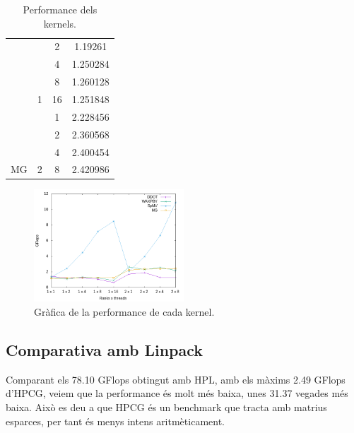 \begin{table}[]
\begin{tabular}{cccc}
                         & \cellcolor[HTML]{EFEFEF}                    & \cellcolor[HTML]{EFEFEF}2  & \cellcolor[HTML]{EFEFEF}1.19261   \\
                         & \cellcolor[HTML]{EFEFEF}                    & 4                          & 1.250284                          \\
                         & \cellcolor[HTML]{EFEFEF}                    & \cellcolor[HTML]{EFEFEF}8  & \cellcolor[HTML]{EFEFEF}1.260128  \\
                         & \multirow{-5}{*}{\cellcolor[HTML]{EFEFEF}1} & 16                         & 1.251848                          \\ \cline{3-4} 
                         &                                             & 1                          & 2.228456                          \\
                         &                                             & \cellcolor[HTML]{EFEFEF}2  & \cellcolor[HTML]{EFEFEF}2.360568  \\
                         &                                             & 4                          & 2.400454                          \\
\multirow{-9}{*}{MG}     & \multirow{-4}{*}{2}                         & \cellcolor[HTML]{EFEFEF}8  & \cellcolor[HTML]{EFEFEF}2.420986  \\ \hline
    \end{tabular}
    \caption{Performance dels kernels.}
    \label{tab:hpcg_kernel_perf}
\end{table}


\begin{figure}
    \centering
    \includegraphics[width=0.5\textwidth]{img/hpcg_kernels_grafica.png}
    \caption{Gràfica de la performance de cada kernel.}
    \label{fig:hpcg_kernel_perf}
\end{figure}

\subsection{Comparativa amb Linpack}
Comparant els 78.10 GFlops obtingut amb HPL, amb els màxims 2.49 GFlops d'HPCG, veiem que la performance és molt més baixa, unes 31.37 vegades més baixa. Això es deu a que HPCG és un benchmark que tracta amb matrius esparces, per tant és menys intens aritmèticament.


